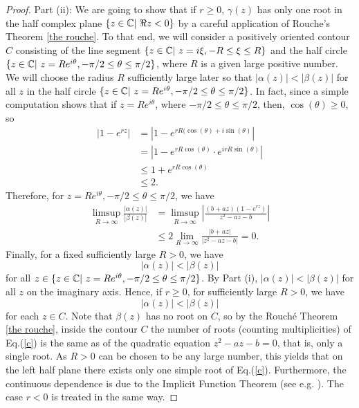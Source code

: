 \documentclass[12pt,letterpaper]{amsart}
\theoremstyle{definition}
\theoremstyle{remark}
\numberwithin{equation}{section}
\begin{document}
\begin{proof}
\medskip
Part (ii): 
We are going to show that if $r\ge 0$,  $\gamma (z)$ has only one root in the half complex plane $\{ z\in \mathbb C| \ \Re z <0\}$ by 
a careful application of Rouche's Theorem \ref{the rouche}. To that end, we will consider a positively oriented contour $C$ consisting of the line segment $\{ z\in \C | \ z=i\xi, -R \le \xi \le R\}$ and the half circle $\{ z\in \C | \ z=Re^{i\theta }, -\pi/2 \le \theta \le \pi /2 \}$, where $R$ is a given large positive number. We 
will choose the radius $R$ sufficiently large later so that $|\alpha (z)| < |\beta (z)|$ for all $z$ in the half circle $\{ z\in \C | \ z=Re^{i\theta }, -\pi/2 \le \theta \le \pi /2 \}$. 
In fact, since a simple computation shows that if $z=Re^{i \theta}$, where $-\pi/2 \le \theta \le \pi /2 $, then, $\cos (\theta )\ge 0$, so
\begin{align*}
|1-e^{rz}| &= |1-e^{rR(\cos (\theta)+i\sin(\theta)}| \\
&=  |1-e^{rR\cos (\theta)}\cdot  e^{irR\sin(\theta)}|\\
& \le1+ e^{rR\cos (\theta)}\\
& \le  2.
\end{align*}
Therefore, for $z=Re^{i\theta }, -\pi/2 \le \theta \le \pi/2 $, we have
\begin{align*}
 \limsup_{R \to \infty} \frac{|\alpha( z) |}{|\beta(z)|} 
&=   \limsup_{R \to \infty} \left| \frac{(b+az) (1-e^{rz} )}{ z^2-az-b}       \right|  \\
&\le   2 \lim_{R \to \infty}   \frac{|b+az|}{ |z^2-az-b|}  =0 .
\end{align*}
Finally, for a fixed sufficiently large $R>0$, we have 
\begin{equation}
|\alpha (z)| <   |\beta (z)|
\end{equation}
for all $z\in \{ z\in \mathbb C | \ z=Re^{i\theta }, -\pi/2 \le \theta \le \pi /2 \}$. By Part (i), $|\alpha (z)| <|\beta (z)|$ for all $z$ on the imaginary axis.
Hence, if $r\ge 0$, for sufficiently large $R>0$, we have
\begin{equation}
|\alpha (z)| < |\beta (z)|
\end{equation}
for each $z\in C$. Note that $\beta(z)$ has no root on $C$, so by the Rouch\' e Theorem \ref{the rouche}, inside the contour $C$ the number of roots (counting multiplicities) of Eq.(\ref{c}) is the same as of the quadratic equation $z^2-az-b=0$, that is, only a single root. As $R>0$ can be chosen to be any large number, this yields that on the left half plane there exists only one simple root of Eq.(\ref{c}).
Furthermore, the continuous dependence is due to the Implicit Function Theorem (see e.g.  \cite{die}). The case $r<0$ is treated in the same way.



\end{proof}
\end{document}
